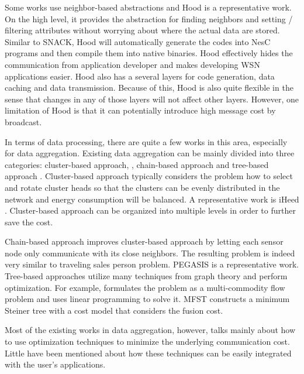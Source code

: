 Some works use neighbor-based abstractions and Hood \cite{hood} is a representative work. On the high level, it provides the abstraction for finding neighbors and setting / filtering attributes without worrying about where the actual data are stored. Similar to SNACK, Hood will automatically generate the codes into NesC programs and then compile them into native binaries. Hood effectively hides the communication from application developer and makes developing WSN applications easier. Hood also has a several layers for code generation, data caching and data transmission. Because of this, Hood is also quite flexible in the sense that changes in any of those layers will not affect other layers. However, one limitation of Hood is that it can potentially introduce high message cost by broadcast.

In terms of data processing, there are quite a few works in this area, especially for data aggregation. Existing data aggregation can be mainly divided into three categories: cluster-based approach, \cite{leach} \cite{iheed}, chain-based approach \cite{pegasis} and tree-based approach \cite{mfst} \cite{dctc}. Cluster-based approach typically considers the problem how to select and rotate cluster heads so that the clusters can be evenly distributed in the network  and energy consumption will be balanced. A representative work is iHeed \cite{iheed}. Cluster-based approach can be organized into multiple levels in order to further save the cost.

Chain-based approach improves cluster-based approach by letting each sensor node only communicate with its close neighbors. The resulting problem is indeed very similar to traveling sales person problem. PEGASIS \cite{pegasis} is a representative work. Tree-based approaches utilize many techniques from graph theory and perform optimization. For example, \cite{xue:lp} formulates the problem as a multi-commodity flow problem and uses linear programming to solve it.  MFST \cite{mfst} constructs a minimum Steiner tree with a cost model that considers the fusion cost.

Most of the existing works in data aggregation, however, talks mainly about how to use optimization techniques to minimize the underlying communication cost. Little have been mentioned about how these techniques can be easily integrated with the user's applications.